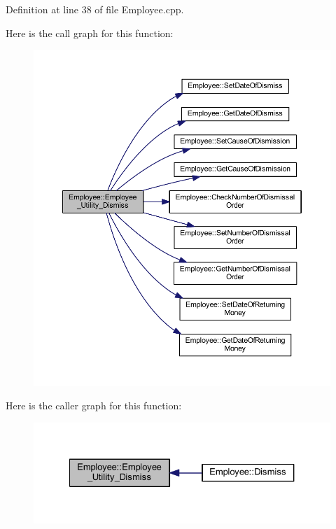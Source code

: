 Definition at line 38 of file Employee.\+cpp.

Here is the call graph for this function\+:
\nopagebreak
\begin{figure}[H]
\begin{center}
\leavevmode
\includegraphics[width=350pt]{class_employee_a6d9c2cbf05d3137a24c322b1525fffa2_cgraph}
\end{center}
\end{figure}
Here is the caller graph for this function\+:
\nopagebreak
\begin{figure}[H]
\begin{center}
\leavevmode
\includegraphics[width=327pt]{class_employee_a6d9c2cbf05d3137a24c322b1525fffa2_icgraph}
\end{center}
\end{figure}
\mbox{\label{class_employee_a462e85cd69817614a7c9e030fb806f29}} 
